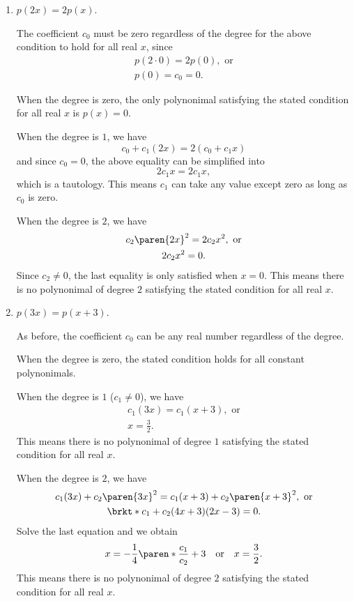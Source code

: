 \documentclass[a4paper]{article}
\begin{document}
\begin{enumerate}
\begin{enumerate}
  \item \(p(2x) = 2p(x)\).

    The coefficient \(c_0\) must be zero regardless of the degree for the
    above condition to hold for all real \(x\), since
    \begin{gather*}
      p(2\cdot 0) = 2p(0), \text{ or} \\
      p(0) = c_0 = 0.
    \end{gather*}

    When the degree is zero, the only polynonimal satisfying the stated
    condition for all real \(x\) is \(p(x) = 0\).

    When the degree is \(1\), we have
    \begin{displaymath}
      c_0 + c_1 (2x) = 2(c_0 + c_1 x)
    \end{displaymath}
    and since \(c_0 = 0\), the above equality can be simplified into
    \begin{displaymath}
      2 c_1 x = 2 c_1 x,
    \end{displaymath}
    which is a tautology.  This means \(c_1\) can take any value except
    zero as long as \(c_0\) is zero.

    When the degree is \(2\), we have
    \begin{gather*}
      c_2 \paren{2x}^2 = 2 c_2 x^2, \text{ or} \\
      2c_2x^2 = 0.
    \end{gather*}
    Since \(c_2 \ne 0\), the last equality is only satisfied when
    \(x = 0\).  This means there is no polynonimal of degree \(2\)
    satisfying the stated condition for all real \(x\).

  \item \(p(3x) = p(x+3)\).

    As before, the coefficient \(c_0\) can be any real number regardless
    of the degree.

    When the degree is zero, the stated condition holds for all constant
    polynonimals.

    When the degree is \(1\) (\(c_1 \ne 0\)), we have
    \begin{gather*}
      c_1 (3x) = c_1 (x+3), \text{ or} \\
      x = \frac32.
    \end{gather*}
    This means there is no polynonimal of degree \(1\) satisfying the
    stated condition for all real \(x\).

    When the degree is \(2\), we have
    \begin{gather*}
      c_1 (3x) + c_2 \paren{3x}^2 = c_1 (x+3) + c_2 \paren{x+3}^2, \text{ or} \\
      \brkt*{c_1 + c_2 (4x+3)} (2x-3) = 0.
    \end{gather*}
    Solve the last equation and we obtain
    \begin{displaymath}
      x = -\frac14 \paren*{\frac{c_1}{c_2} + 3} \quad \text{or} \quad x = \frac32.
    \end{displaymath}
    This means there is no polynonimal of degree \(2\) satisfying the
    stated condition for all real \(x\).
  \end{enumerate}
\end{enumerate}
\end{document}
